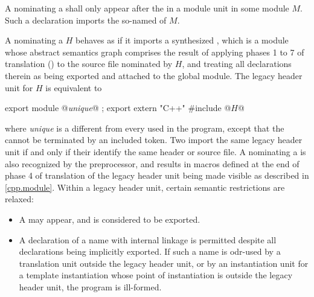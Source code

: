 \begin{std.txt}
  \begin{after}\color{addclr}
  \alinea
  A  nominating
  a  shall only appear after
  the  in a module unit in
  some module $M$.
  Such a declaration imports the so-named
   of $M$.

  \color{addclr}
  \alinea
  A  nominating
  a  $H$ behaves as if it imports
  a synthesized ,
  which is a module whose abstract semantics graph
  comprises the result of applying
  phases 1 to 7 of translation ()
  to the source file nominated by $H$, and
  treating all declarations therein as being
  exported and attached to the global module.
  \enternote
  The legacy header unit for $H$ is equivalent to
  \begin{codeblock}\color{addclr}
  export module @\textit{unique}@ ;
  export extern "C++" {
  #include @$H$@
  }\end{codeblock}
  where \textit{unique} is a 
  different from every 
  used in the program,
  except that the  cannot be
  terminated by an included \tcode{\}} token.
  \exitnote
  Two
  import the same legacy header unit if and only if
  their  identify the same
  header or source file.
  \enternote
  A  nominating
  a  is also recognized by the
  preprocessor, and results in macros defined at the
  end of phase 4 of translation of the legacy header unit
  being made visible as described in \ref{cpp.module}.
  \exitnote
  Within a legacy header unit, certain semantic restrictions
  are relaxed:
  \begin{itemize}
  \item A  may appear,
  and is considered to be exported.
  \item A declaration of a name with internal linkage is
  permitted despite all declarations being implicitly exported.
  If such a name is
  odr-used by a translation unit outside the legacy
  header unit, or by an instantiation unit for a template
  instantiation whose point of instantiation is outside
  the legacy header unit, the program is ill-formed.
  \end{itemize}
  \end{after}


\end{std.txt}
